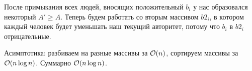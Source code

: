 \begin{enumerate}
\begin{enumerate}
\begin{solution}
            После примыкания всех людей, вносящих положительный $b_i$ у нас образовался некоторый $A' \geq A$. Теперь будем работать со вторым массивом $b2_i$, в котором каждый человек будет уменьшать наш текущий авторитет, потому что $b_i$ в $b2_i$ отрицательные.



            Асимптотика: разбиваем на разные массивы за $\mathcal{O}(n)$, сортируем массивы за $\mathcal{O}(n \log n)$. Суммарно $\mathcal{O}(n \log n)$.
        \end{solution}
	\end{enumerate}







\end{enumerate}
